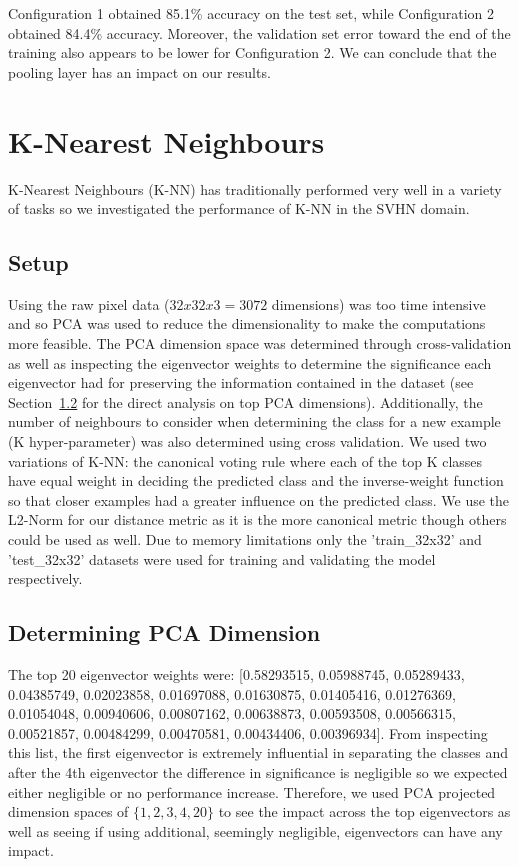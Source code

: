 \documentclass{article} %
\begin{document}
Configuration 1 obtained 85.1\% accuracy on the test set, while Configuration 2 obtained 84.4\% accuracy. Moreover, the validation set error toward the end of the training also appears to be lower for Configuration 2. We can conclude that the pooling layer has an impact on our results. 

\subsubsection{}

\section{K-Nearest Neighbours}
K-Nearest Neighbours (K-NN) has traditionally performed very well in a variety of tasks so we investigated the performance of K-NN in the SVHN domain.

\subsection{Setup}
Using the raw pixel data ($32 x 32 x 3 = 3072$ dimensions) was too time intensive and so PCA was used to reduce the dimensionality to make the computations more feasible.  The PCA dimension space was determined through cross-validation as well as inspecting the eigenvector weights to determine the significance each eigenvector had for preserving the information contained in the dataset (see Section~\ref{knn_pca} for the direct analysis on top PCA dimensions).  Additionally, the number of neighbours to consider when determining the class for a new example (K hyper-parameter) was also determined using cross validation.  We used two variations of K-NN: the canonical voting rule where each of the top K classes have equal weight in deciding the predicted class and the inverse-weight function so that closer examples had a greater influence on the predicted class. We use the L2-Norm for our distance metric as it is the more canonical metric though others could be used as well. Due to memory limitations only the 'train\_32x32' and 'test\_32x32' datasets were used for training and validating the model respectively.

\subsection{Determining PCA Dimension} \label{knn_pca}
The top 20 eigenvector weights were: [0.58293515, 0.05988745, 0.05289433, 0.04385749, 0.02023858, 0.01697088, 0.01630875, 0.01405416, 0.01276369, 0.01054048, 0.00940606, 0.00807162, 0.00638873, 0.00593508, 0.00566315, 0.00521857, 0.00484299, 0.00470581, 0.00434406, 0.00396934].  From inspecting this list, the first eigenvector is extremely influential in separating the classes and after the 4th eigenvector the difference in significance is negligible so we expected either negligible or no performance increase.  Therefore, we used PCA projected dimension spaces of $\{1, 2, 3, 4, 20\}$ to see the impact across the top eigenvectors as well as seeing if using additional, seemingly negligible, eigenvectors can have any impact.
\end{document}
